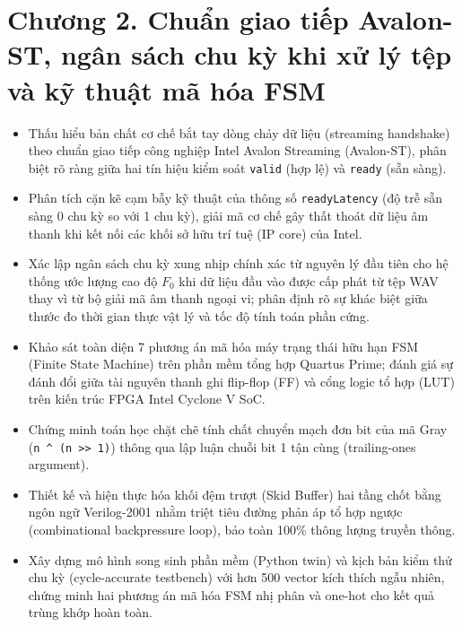 \providecommand{\todo}[1]{\textcolor{red}{\textbf{[TODO: #1]}}}
\clearpage
{}
\section*{Chương 2. Chuẩn giao tiếp Avalon-ST, ngân sách chu kỳ khi xử lý tệp và kỹ thuật mã hóa FSM}

\begin{learningobj}
\begin{itemize}[leftmargin=1.5em, itemsep=2pt]
    \item Thấu hiểu bản chất cơ chế bắt tay dòng chảy dữ liệu (streaming handshake) theo chuẩn giao tiếp công nghiệp Intel Avalon Streaming (Avalon-ST), phân biệt rõ ràng giữa hai tín hiệu kiểm soát \texttt{valid} (hợp lệ) và \texttt{ready} (sẵn sàng).
    \item Phân tích cặn kẽ cạm bẫy kỹ thuật của thông số \texttt{readyLatency} (độ trễ sẵn sàng 0 chu kỳ so với 1 chu kỳ), giải mã cơ chế gây thất thoát dữ liệu âm thanh khi kết nối các khối sở hữu trí tuệ (IP core) của Intel.
    \item Xác lập ngân sách chu kỳ xung nhịp chính xác từ nguyên lý đầu tiên cho hệ thống ước lượng cao độ $F_0$ khi dữ liệu đầu vào được cấp phát từ tệp WAV thay vì từ bộ giải mã âm thanh ngoại vi; phân định rõ sự khác biệt giữa thước đo thời gian thực vật lý và tốc độ tính toán phần cứng.
    \item Khảo sát toàn diện 7 phương án mã hóa máy trạng thái hữu hạn FSM (Finite State Machine) trên phần mềm tổng hợp Quartus Prime; đánh giá sự đánh đổi giữa tài nguyên thanh ghi flip-flop (FF) và cổng logic tổ hợp (LUT) trên kiến trúc FPGA Intel Cyclone V SoC.
    \item Chứng minh toán học chặt chẽ tính chất chuyển mạch đơn bit của mã Gray (\texttt{n \^{} (n >> 1)}) thông qua lập luận chuỗi bit 1 tận cùng (trailing-ones argument).
    \item Thiết kế và hiện thực hóa khối đệm trượt (Skid Buffer) hai tầng chốt bằng ngôn ngữ Verilog-2001 nhằm triệt tiêu đường phản áp tổ hợp ngược (combinational backpressure loop), bảo toàn 100\% thông lượng truyền thông.
    \item Xây dựng mô hình song sinh phần mềm (Python twin) và kịch bản kiểm thử chu kỳ (cycle-accurate testbench) với hơn 500 vector kích thích ngẫu nhiên, chứng minh hai phương án mã hóa FSM nhị phân và one-hot cho kết quả trùng khớp hoàn toàn.
\end{itemize}
\end{learningobj}

